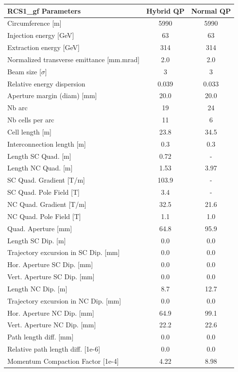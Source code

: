 \begin{tabular}{lcc}
\toprule
RCS1_gf Parameters & Hybrid QP & Normal QP \\
\midrule
Circumference [m] & 5990 & 5990 \\
Injection energy [GeV] & 63 & 63 \\
Extraction energy [GeV] & 314 & 314 \\
Normalized transverse emittance [mm.mrad] & 2.0 & 2.0 \\
Beam size [$\sigma$] & 3 & 3 \\
Relative energy dispersion & 0.039 & 0.033 \\
Aperture margin (diam) [mm] & 20.0 & 20.0 \\
Nb arc & 19 & 24 \\
Nb cells per arc & 11 & 6 \\
Cell length [m] & 23.8 & 34.5 \\
Interconnection length [m] & 0.3 & 0.3 \\
Length SC Quad. [m] & 0.72 & - \\
Length NC Quad. [m] & 1.53 & 3.97 \\
SC Quad. Gradient [T/m] & 103.9 & - \\
SC Quad. Pole Field [T] & 3.4 & - \\
NC Quad. Gradient [T/m] & 32.5 & 21.6 \\
NC Quad. Pole Field [T] & 1.1 & 1.0 \\
Quad. Aperture [mm] & 64.8 & 95.9 \\
Length SC Dip. [m] & 0.0 & 0.0 \\
Trajectory excursion in SC Dip. [mm] & 0.0 & 0.0 \\
Hor. Aperture SC Dip. [mm] & 0.0 & 0.0 \\
Vert. Aperture SC Dip. [mm] & 0.0 & 0.0 \\
Length NC Dip. [m] & 8.7 & 12.7 \\
Trajectory excursion in NC Dip. [mm] & 0.0 & 0.0 \\
Hor. Aperture NC Dip. [mm] & 64.9 & 99.1 \\
Vert. Aperture NC Dip. [mm] & 22.2 & 22.6 \\
Path length diff. [mm] & 0.0 & 0.0 \\
Relative path length diff. [1e-6] & 0.0 & 0.0 \\
Momentum Compaction Factor [1e-4] & 4.22 & 8.98 \\
\bottomrule
\end{tabular}
